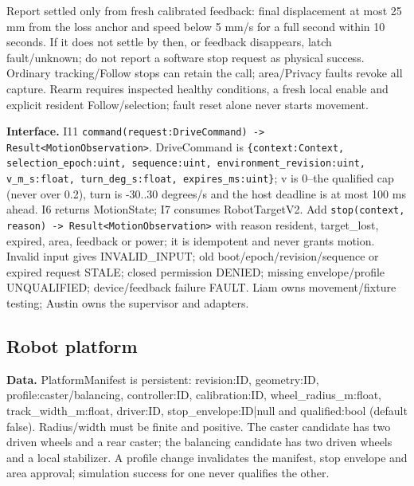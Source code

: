 \documentclass[12pt,letterpaper]{article}
\newcommand{\field}[1]{\texttt{#1}}
\begin{document}
Report settled only from fresh calibrated feedback: final displacement at most 25 mm from the loss anchor and speed below 5 mm/s for a full second within 10 seconds. If it does not settle by then, or feedback disappears, latch fault/unknown; do not report a software stop request as physical success. Ordinary tracking/Follow stops can retain the call; area/Privacy faults revoke all capture. Rearm requires inspected healthy conditions, a fresh local enable and explicit resident Follow/selection; fault reset alone never starts movement.

\textbf{Interface.} I11 \field{command(request:DriveCommand) -> Result<MotionObservation>}. DriveCommand is \field{\{context:Context, selection\_\allowbreak{}epoch:uint, sequence:uint, environment\_\allowbreak{}revision:uint, v\_\allowbreak{}m\_\allowbreak{}s:float, turn\_\allowbreak{}deg\_\allowbreak{}s:float, expires\_\allowbreak{}ms:uint\}}; v is 0--the qualified cap (never over 0.2), turn is -30..30 degrees/s and the host deadline is at most 100 ms ahead. I6 returns MotionState; I7 consumes RobotTargetV2. Add \field{stop(context, reason) -> Result<MotionObservation>} with reason resident, target\_\allowbreak{}lost, expired, area, feedback or power; it is idempotent and never grants motion. Invalid input gives INVALID\_\allowbreak{}INPUT; old boot/epoch/revision/sequence or expired request STALE; closed permission DENIED; missing envelope/profile UNQUALIFIED; device/feedback failure FAULT. Liam owns movement/fixture testing; Austin owns the supervisor and adapters.

\subsection*{Robot platform}
\textbf{Data.} PlatformManifest is persistent: revision:ID, geometry:ID, profile:caster/balancing, controller:ID, calibration:ID, wheel\_\allowbreak{}radius\_\allowbreak{}m:float, track\_\allowbreak{}width\_\allowbreak{}m:float, driver:ID, stop\_\allowbreak{}envelope:ID|null and qualified:bool (default false). Radius/width must be finite and positive. The caster candidate has two driven wheels and a rear caster; the balancing candidate has two driven wheels and a local stabilizer. A profile change invalidates the manifest, stop envelope and area approval; simulation success for one never qualifies the other.
\end{document}
